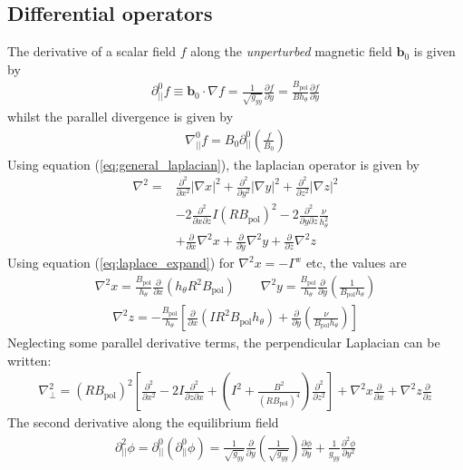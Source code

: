 \documentclass[12pt]{article}
\newcommand{\deriv}[2]{\ensuremath{\frac{\partial #1}{\partial #2}}}
\newcommand{\dderiv}[2]{\ensuremath{\frac{\partial^2 #1}{\partial {#2}^2}}}
\newcommand{\hthe}{\ensuremath{h_\theta}}
\newcommand{\Bp}{\ensuremath{B_{\text{pol}}}}
\newcommand{\ve}[1]{\ensuremath{\boldsymbol{#1}}}
\newcommand{\delp}{\nabla_\perp^2}
\newcommand{\rbp}{\ensuremath{R\Bp}}
\newcommand{\rbpsq}{\ensuremath{\left(\rbp\right)^2}}
\begin{document}
\subsection{Differential operators}
The derivative of a scalar field $f$ along the \emph{unperturbed} magnetic
field $\ve{b}_0$ is given by
%
\begin{align*}
\partial^0_{||}f \equiv \ve{b}_0 \cdot\nabla f =
\frac{1}{\sqrt{g_{yy}}}\deriv{f}{y} = \frac{\Bp}{B\hthe}\deriv{f}{y}
\end{align*}
%
whilst the parallel divergence is given by
%
\begin{align*}
\nabla^0_{||}f = B_0\partial^0_{||}\left(\frac{f}{B_0}\right)
\end{align*}
%
Using equation (\ref{eq:general_laplacian}), the laplacian operator is given by
%
\begin{align*}
\nabla^2 = &\frac{\partial^2}{\partial x^2}\left|\nabla x\right|^2 +
\frac{\partial^2}{\partial y^2}\left|\nabla y\right|^2 +
\frac{\partial^2}{\partial z^2}\left|\nabla z\right|^2 \nonumber \\
&-2\frac{\partial^2}{\partial x\partial z}I\left(R\Bp\right)^2 -
2\frac{\partial^2}{\partial y\partial z}\frac{\nu}{h_\theta^2}\\
&+\frac{\partial}{\partial x}\nabla^2x + \frac{\partial}{\partial y}\nabla^2y +
\frac{\partial}{\partial z}\nabla^2z \nonumber
\end{align*}
%
Using equation (\ref{eq:laplace_expand}) for $\nabla^2x = -\Gamma^x$ etc, the
values are
%
\begin{align*}
\nabla^2x = \frac{\Bp}{h_\theta}\frac{\partial}{\partial 
x}\left(h_\theta
R^2\Bp\right) \qquad
\nabla^2y = \frac{\Bp}{h_\theta}\frac{\partial}{\partial
y}\left(\frac{1}{\Bp h_\theta}\right)
\end{align*}
%
%
\begin{align*}
\nabla^2z = -\frac{\Bp}{h_\theta}\left[\frac{\partial}{\partial
x}\left(IR^2\Bp h_\theta\right) + \frac{\partial}{\partial
y}\left(\frac{\nu}{\Bp h_\theta}\right)\right]
\end{align*}
%
Neglecting some parallel derivative terms, the perpendicular Laplacian can be
written:
%
\begin{align*}
\delp = \rbpsq\left[\dderiv{}{x} - 2I\frac{\partial^2}{\partial z\partial x} +
\left(I^2 + \frac{B^2}{\left(\rbp\right)^4}\right)\dderiv{}{z}\right] +
\nabla^2 x \deriv{}{x} + \nabla^2 z\deriv{}{z}
\end{align*}
%
The second derivative along the equilibrium field
%
\begin{align*}
\partial^2_{||}\phi = \partial^0_{||}\left(\partial^0_{||}\phi\right) =
\frac{1}{\sqrt{g_{yy}}}\deriv{}{y}\left(\frac{1}{\sqrt{g_{yy}}}\right)\deriv{
\phi}{y} + \frac{1}{g_{yy}}\frac{\partial^2\phi}{\partial y^2}
\end{align*}
\end{document}
